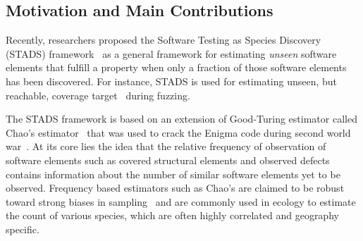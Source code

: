 \documentclass[sigconf,review,anonymous]{acmart}
\begin{document}
%

%
%
%
%

\subsection{Motivation and Main Contributions}

Recently, researchers proposed the Software Testing as Species Discovery (STADS) framework~\cite{bohme2018assurances}
as a general framework for estimating %
\emph{unseen} software %
elements that fulfill a property when only a fraction of those software elements has been discovered.
For instance, STADS is used for estimating unseen, but reachable, coverage target~\cite{fuzzingbook2023:WhenToStopFuzzing} during fuzzing.

The STADS framework is based on an extension of Good-Turing estimator 
called Chao's estimator~\cite{chao2016nonparametric} that was used to crack
the Enigma code during second world war~\cite{fuzzingbook2023:WhenToStopFuzzing}.
%
At its core lies the idea that the relative frequency of observation of software elements such as covered
structural elements and observed defects contains information about the number of similar
software elements %
yet to be observed.
%
Frequency based estimators such as Chao's are claimed to be robust toward strong biases in sampling~\cite{chao2016species} and are commonly used in ecology to estimate the count of various
species, which are often highly correlated and geography specific. 
\end{document}

